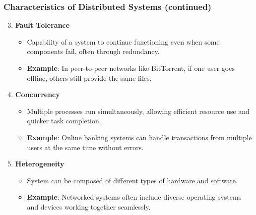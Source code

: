 \documentclass[aspectratio=169]{beamer}
\begin{document}
\begin{frame}[fragile]
    \frametitle{Characteristics of Distributed Systems (continued)}
    \begin{enumerate}
        \setcounter{enumi}{2}
        \item \textbf{Fault Tolerance}
            \begin{itemize}
                \item Capability of a system to continue functioning even when some components fail, often through redundancy.
                \item \textbf{Example}: In peer-to-peer networks like BitTorrent, if one user goes offline, others still provide the same files.
            \end{itemize}
            
        \item \textbf{Concurrency}
            \begin{itemize}
                \item Multiple processes run simultaneously, allowing efficient resource use and quicker task completion.
                \item \textbf{Example}: Online banking systems can handle transactions from multiple users at the same time without errors.
            \end{itemize}
            
        \item \textbf{Heterogeneity}
            \begin{itemize}
                \item System can be composed of different types of hardware and software.
                \item \textbf{Example}: Networked systems often include diverse operating systems and devices working together seamlessly.
            \end{itemize}
    \end{enumerate}
\end{frame}
\end{document}
